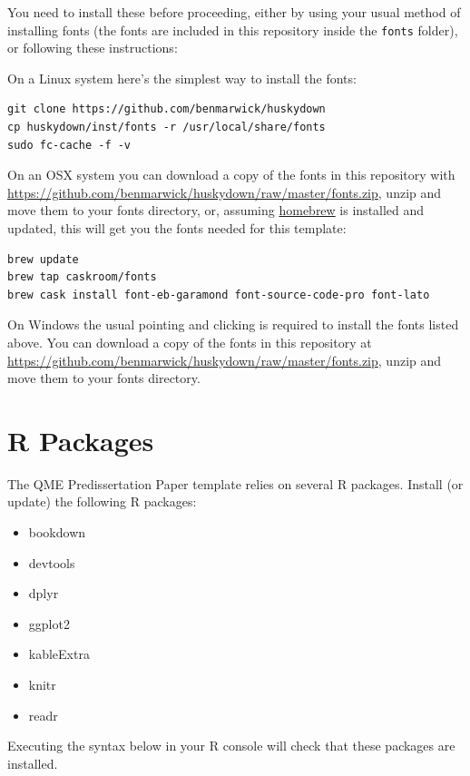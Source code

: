 \documentclass[12pt,letterpaper,oneside,oldfontcommands]{memoir}
\providecommand{\tightlist}{%
  \setlength{\itemsep}{0pt}\setlength{\parskip}{0pt}}
\theoremstyle{definition}
\theoremstyle{definition}
\theoremstyle{definition}
\theoremstyle{remark}
\begin{document}
You need to install these before proceeding, either by using your usual
method of installing fonts (the fonts are included in this repository
inside the \texttt{fonts} folder), or following these instructions:

On a Linux system here's the simplest way to install the fonts:

\begin{verbatim}
git clone https://github.com/benmarwick/huskydown
cp huskydown/inst/fonts -r /usr/local/share/fonts
sudo fc-cache -f -v
\end{verbatim}

On an OSX system you can download a copy of the fonts in this repository
with \url{https://github.com/benmarwick/huskydown/raw/master/fonts.zip},
unzip and move them to your fonts directory, or, assuming
\href{https://brew.sh/}{homebrew} is installed and updated, this will
get you the fonts needed for this template:

\begin{verbatim}
brew update
brew tap caskroom/fonts
brew cask install font-eb-garamond font-source-code-pro font-lato
\end{verbatim}

On Windows the usual pointing and clicking is required to install the
fonts listed above. You can download a copy of the fonts in this
repository at
\url{https://github.com/benmarwick/huskydown/raw/master/fonts.zip},
unzip and move them to your fonts directory.

\hypertarget{r-packages}{%
\section{R Packages}\label{r-packages}}

The QME Predissertation Paper template relies on several R packages.
Install (or update) the following R packages:

\begin{itemize}
\tightlist
\item
  bookdown
\item
  devtools
\item
  dplyr
\item
  ggplot2
\item
  kableExtra
\item
  knitr
\item
  readr
\end{itemize}

Executing the syntax below in your R console will check that these
packages are installed.
\end{document}

